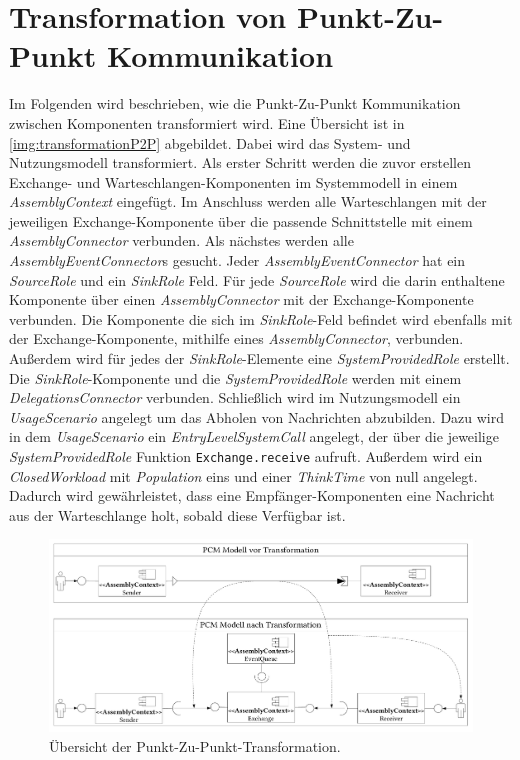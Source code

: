 \section{Transformation von Punkt-Zu-Punkt Kommunikation}
Im Folgenden wird beschrieben, wie die Punkt-Zu-Punkt Kommunikation zwischen Komponenten transformiert wird. Eine Übersicht ist in \autoref{img:transformationP2P} abgebildet. Dabei wird das System- und Nutzungsmodell transformiert. Als erster Schritt werden die zuvor erstellen Exchange- und Warteschlangen-Komponenten im Systemmodell in einem \emph{AssemblyContext} eingefügt. Im Anschluss werden alle Warteschlangen mit der jeweiligen Exchange-Komponente über die passende Schnittstelle mit einem \emph{AssemblyConnector} verbunden. Als nächstes werden alle \emph{AssemblyEventConnector}s gesucht. Jeder \emph{AssemblyEventConnector} hat ein \emph{SourceRole} und ein \emph{SinkRole} Feld. Für jede \emph{SourceRole} wird die darin enthaltene Komponente über einen \emph{AssemblyConnector} mit der Exchange-Komponente verbunden. Die Komponente die sich im \emph{SinkRole}-Feld befindet wird ebenfalls mit der Exchange-Komponente, mithilfe eines \emph{AssemblyConnector}, verbunden. Außerdem wird für jedes der \emph{SinkRole}-Elemente eine \emph{SystemProvidedRole} erstellt. Die \emph{SinkRole}-Komponente und die \emph{SystemProvidedRole} werden mit einem \emph{DelegationsConnector} verbunden. Schließlich wird im Nutzungsmodell ein \emph{UsageScenario} angelegt um das Abholen von Nachrichten abzubilden. Dazu wird in dem \emph{UsageScenario} ein \emph{EntryLevelSystemCall} angelegt, der über die jeweilige \emph{SystemProvidedRole} Funktion \texttt{Exchange.receive} aufruft. Außerdem wird ein \emph{ClosedWorkload} mit \emph{Population} eins und einer \emph{ThinkTime} von null angelegt. Dadurch wird gewährleistet, dass eine Empfänger-Komponenten eine Nachricht aus der Warteschlange holt, sobald diese Verfügbar ist.

\begin{figure}
\center
  \includegraphics[width=1.3\textwidth, angle=90]{images/transformation/transformationSystemP2P.pdf}
  \caption{Übersicht der Punkt-Zu-Punkt-Transformation.}
  \label{img:transformationP2P}
\end{figure}


